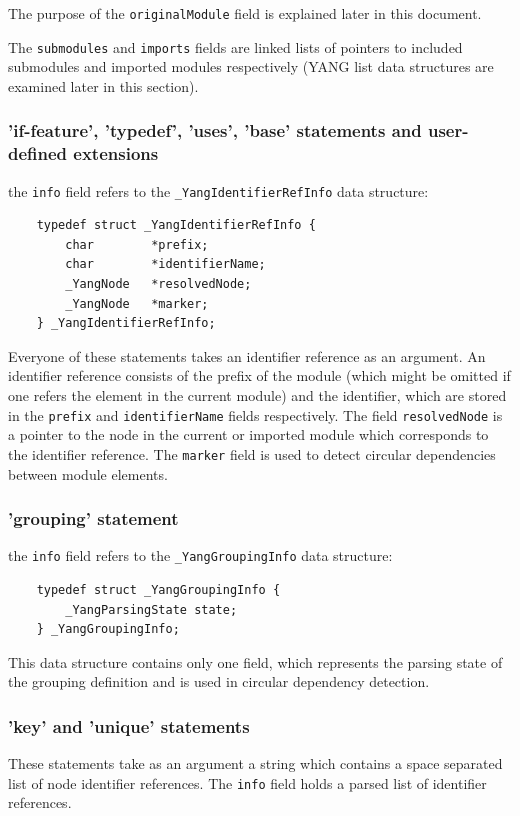 \documentclass[conference]{IEEEtran}
\begin{document}
The purpose of the \texttt{originalModule} field is explained later in this document.

The \texttt{submodules} and \texttt{imports} fields are linked lists of pointers to included submodules and imported modules respectively (YANG list data structures are examined later in this section).

\subsubsection{'if-feature', 'typedef', 'uses', 'base' statements and user-defined extensions}
the \texttt{info} field refers to the \texttt{\_YangIdentifierRefInfo} data structure:
\small
\begin{verbatim}
    typedef struct _YangIdentifierRefInfo {
        char        *prefix;
        char        *identifierName;
        _YangNode   *resolvedNode;
        _YangNode   *marker;
    } _YangIdentifierRefInfo;
\end{verbatim}
\normalsize
Everyone of these statements takes an identifier reference as an argument. An identifier reference consists of the prefix of the module (which might be omitted if one refers the element in the current module) and the identifier, which are stored in the \texttt{prefix} and \texttt{identifierName} fields respectively. The field \texttt{resolvedNode} is a pointer to the node in the current or imported module which corresponds to the identifier reference. The \texttt{marker} field is used to detect circular dependencies between module elements.

\subsubsection{'grouping' statement}
the \texttt{info} field refers to the \texttt{\_YangGroupingInfo} data structure:
\small
\begin{verbatim}
    typedef struct _YangGroupingInfo {
        _YangParsingState state;
    } _YangGroupingInfo;
\end{verbatim}
\normalsize
This data structure contains only one field, which represents the parsing state of the grouping definition and is used in circular dependency detection.

\subsubsection{'key' and 'unique' statements}
These statements take as an argument a string which contains a space separated list of node identifier references. The \texttt{info} field holds a parsed list of identifier references.
\end{document}
